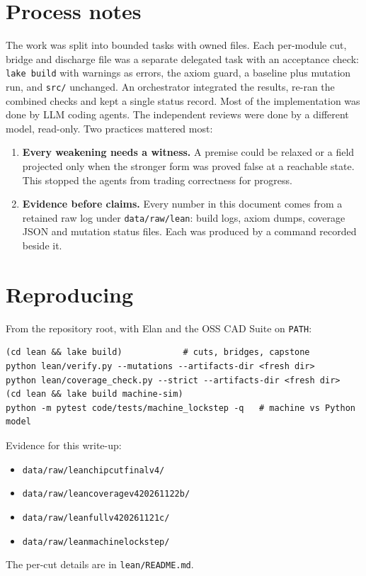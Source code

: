 \documentclass[11pt,a4paper]{article}
\newcommand{\brkus}{\textunderscore\allowbreak}
\newcommand{\code}[1]{{\let\_\brkus\texttt{#1}}}
\begin{document}
\section{Process notes}

The work was split into bounded tasks with owned files. Each per-module cut,
bridge and discharge file was a separate delegated task with an acceptance
check: \code{lake build} with warnings as errors, the axiom guard, a baseline
plus mutation run, and \code{src/} unchanged. An orchestrator integrated the
results, re-ran the combined checks and kept a single status record. Most of
the implementation was done by LLM coding agents. The independent reviews
were done by a different model, read-only. Two practices mattered most:
\begin{enumerate}
\item \textbf{Every weakening needs a witness.} A premise could be relaxed or a
  field projected only when the stronger form was proved false at a reachable
  state. This stopped the agents from trading correctness for progress.
\item \textbf{Evidence before claims.} Every number in this document comes from
  a retained raw log under \code{data/raw/lean\_*}: build logs, axiom dumps,
  coverage JSON and mutation status files. Each was produced by a command
  recorded beside it.
\end{enumerate}

\section{Reproducing}
From the repository root, with Elan and the OSS CAD Suite on \code{PATH}:
\begin{lstlisting}[language={}]
(cd lean && lake build)            # cuts, bridges, capstone
python lean/verify.py --mutations --artifacts-dir <fresh dir>
python lean/coverage_check.py --strict --artifacts-dir <fresh dir>
(cd lean && lake build machine-sim)
python -m pytest code/tests/machine_lockstep -q   # machine vs Python model
\end{lstlisting}
Evidence for this write-up:
\begin{itemize}
\item \code{data/raw/lean\_chipcut\_final\_v4\_20261122/}
\item \code{data/raw/lean\_coverage\_v4\_20261122b/}
\item \code{data/raw/lean\_full\_v4\_20261121c/}
\item \code{data/raw/lean\_machine\_lockstep\_20261122/}
\end{itemize}
The per-cut details are in \code{lean/README.md}.
\end{document}
